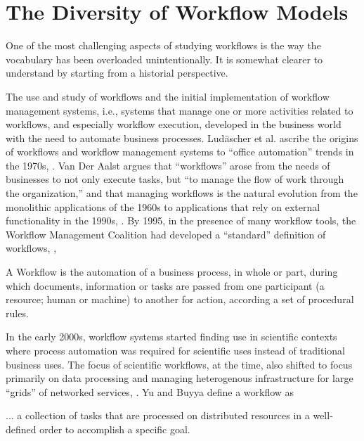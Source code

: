 \section{The Diversity of Workflow Models}\label{workflows}

One of the most challenging aspects of studying workflows is the way the
vocabulary has been overloaded unintentionally.  It is somewhat clearer to
understand by starting from a historial perspective.

The use and study of workflows and the initial implementation of workflow
management systems, i.e., systems that manage one or more activities related to
workflows, and especially workflow execution, developed in the business world
with the need to automate business processes. Lud\"{a}scher et al.  ascribe the
origins of workflows and workflow management systems to ``office automation''
trends in the 1970s, \cite{ludascher_scientific_2006}. Van Der Aalst argues that
``workflows'' arose from the needs of businesses to not only execute tasks, but
``to manage the flow of work through the organization,'' and that managing
workflows is the natural evolution from the monolithic applications of the 1960s
to applications that rely on external functionality in the 1990s,
\cite{van_der_aalst_application_1998}. By 1995, in the presence of many workflow
tools, the Workflow Management Coalition had developed a ``standard'' definition
of workflows, \cite{hollingsworth_workflow_1993},

\begin{displayquote} A Workflow is the automation of a business process, in
whole or part, during which documents, information or tasks are passed from one
participant (a resource; human or machine) to another for action, according a
set of procedural rules.  \end{displayquote}

In the early 2000s, workflow systems started finding use in scientific contexts
where process automation was required for scientific uses instead of traditional
business uses. The focus of scientific workflows, at the time, also shifted to
focus primarily on data processing and managing heterogenous infrastructure for
large ``grids'' of networked services,
\cite{yu_taxonomy_2005}. Yu and Buyya define a workflow as

\begin{displayquote} ... a collection of tasks that are processed on distributed
resources in a well-defined order to accomplish a specific goal.
\end{displayquote}


